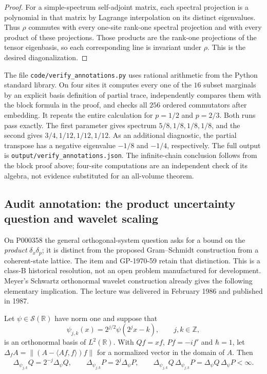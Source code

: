 \begin{proof}
For a simple-spectrum self-adjoint matrix, each spectral projection
is a polynomial in that matrix by Lagrange interpolation on its
distinct eigenvalues. Thus $\rho$ commutes with every one-site
rank-one spectral projection and with every product of these
projections. Those products are the rank-one projections of the
tensor eigenbasis, so each corresponding line is invariant under
$\rho$. This is the desired diagonalization.
\end{proof}

\begin{example}\oursComputed{}
The file \nolinkurl{code/verify_annotations.py} uses rational
arithmetic from the Python standard library. On four sites it
computes every one of the $16$ subset marginals by an explicit
basis definition of partial trace, independently compares them
with the block formula in the proof, and checks all $256$ ordered
commutators after embedding. It repeats the entire calculation
for $p=1/2$ and $p=2/3$. Both runs pass exactly. The first parameter
gives spectrum $5/8,1/8,1/8,1/8$, and the second gives
$3/4,1/12,1/12,1/12$. As an additional diagnostic, the partial
transpose has a negative eigenvalue $-1/8$ and $-1/4$, respectively.
The full output is \nolinkurl{output/verify_annotations.json}.
The infinite-chain conclusion follows from the block proof above;
four-site computations are an independent check of its algebra,
not evidence substituted for an all-volume theorem.
\end{example}

\subsection{Audit annotation: the product uncertainty question and wavelet scaling}
\label{dev:wavelet}

On P000358 the general orthogonal-system question asks for a bound
on the \emph{product} $\delta_x\delta_p$; it is distinct from the
proposed Gram--Schmidt construction from a coherent-state lattice.
The item and GP-1970-59 retain that distinction. This is a class-B
historical resolution, not an open problem manufactured for
development. Meyer's Schwartz orthonormal wavelet construction
\citep[\S2, Thm.~1]{meyer1987uncertainty} already gives the
following elementary implication. The lecture was delivered in
February 1986 and published in 1987.

\begin{proposition}\ours{}
Let $\psi\in\mathcal S(\mathbb R)$ have norm one and suppose that
\[
 \psi_{j,k}(x)=2^{j/2}\psi(2^jx-k),\qquad j,k\in\mathbb Z,
\]
is an orthonormal basis of $L^2(\mathbb R)$. With
$Qf=xf$, $Pf=-if'$ and $\hbar=1$, let
$\Delta_f A=\|(A-\langle Af,f\rangle)f\|$ for a normalized vector
in the domain of $A$. Then
\[
 \Delta_{\psi_{j,k}}Q=2^{-j}\Delta_\psi Q,
 \qquad\Delta_{\psi_{j,k}}P=2^j\Delta_\psi P,
 \qquad
 \Delta_{\psi_{j,k}}Q\,\Delta_{\psi_{j,k}}P
 =\Delta_\psi Q\,\Delta_\psi P<\infty.
\]
\end{proposition}


